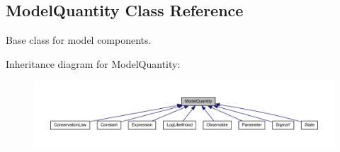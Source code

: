 \hypertarget{classamici_1_1ode__export_1_1_model_quantity}{}\subsection{Model\+Quantity Class Reference}
\label{classamici_1_1ode__export_1_1_model_quantity}


Base class for model components.  




Inheritance diagram for Model\+Quantity\+:
\nopagebreak
\begin{figure}[H]
\begin{center}
\leavevmode
\includegraphics[width=350pt]{classamici_1_1ode__export_1_1_model_quantity__inherit__graph}
\end{center}
\end{figure}
